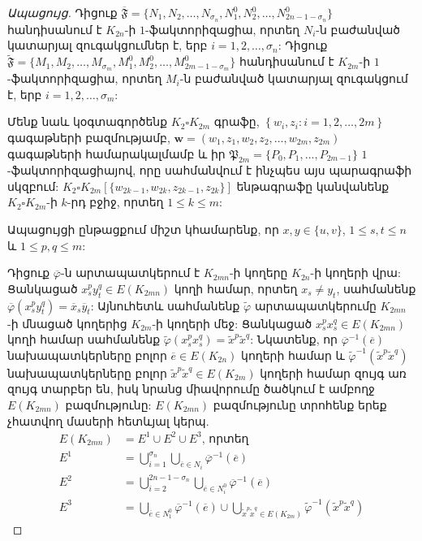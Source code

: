\begin{hide}
\begin{proof}[Ապացույց]
Դիցուք $\overline{\mathfrak{F}} = \{ N_1,N_2,\ldots,N_{\sigma_n},N^0_1,N^0_2,\ldots, N^0_{2n-1-\sigma_n} \}$ հանդիսանում է $K_{2n}$-ի $1$-ֆակտորիզացիա, որտեղ $N_i$-ն բաժանված կատարյալ զուգակցումներ է, երբ $i=1,2,\ldots,\sigma_n$: Դիցուք $\widetilde{\mathfrak{F}} = \{ M_1,M_2,\ldots,M_{\sigma_m},M^0_1,M^0_2,\ldots, M^0_{2m-1-\sigma_m} \}$ հանդիսանում է $K_{2m}$-ի $1$-ֆակտորիզացիա, որտեղ $M_i$-ն բաժանված կատարյալ զուգակցում է, երբ $i=1,2,\ldots,\sigma_m$: 

Մենք նաև կօգտագործենք $K_2 \square K_{2m}$ գրաֆը, $\left\{w_i,z_i : i=1,2,\ldots,2m\right\}$ գագաթների բազմությամբ, $\mathbf{w} = \left( w_1,z_1,w_2,z_2,\ldots,w_{2m},z_{2m} \right)$ գագաթների համարակալմամբ և իր $\mathfrak{P}_{2m} = \{P_0,P_1,\ldots,P_{2m-1} \}$ $1$-ֆակտորիզացիայով, որը սահմանվում է ինչպես այս պարագրաֆի սկզբում: $K_2 \square K_{2m}[\{w_{2k-1},w_{2k},z_{2k-1},z_{2k}\}]$ ենթագրաֆը կանվանենք $K_2 \square K_{2m}$-ի $k$-րդ բջիջ, որտեղ $1 \leq k \leq m$:

Ապացույցի ընթացքում միշտ կհամարենք, որ $x,y \in \{u,v\}$, $1 \leq s,t \leq n$ և $1 \leq p,q \leq m$:

Դիցուք $\overline{\varphi}$-ն արտապատկերում է $K_{2mn}$-ի կողերը $K_{2n}$-ի կողերի վրա: Ցանկացած $x^p_sy^q_t \in E(K_{2mn})$ կողի համար, որտեղ $x_s \neq y_t$, սահմանենք $\overline{\varphi}(x^p_sy^q_t)=\overline{x}_s\overline{y}_t$: Այնուհետև սահմանենք $\widetilde{\varphi}$ արտապատկերումը $K_{2mn}$-ի մնացած կողերից $K_{2m}$-ի կողերի մեջ: Ցանկացած $x^p_sx^q_s \in E(K_{2mn})$ կողի համար սահմանենք $\widetilde{\varphi}( x^p_sx^q_s ) = \widetilde{x}^p\widetilde{x}^q$: Նկատենք, որ $\overline{\varphi}^{-1}(\overline{e})$ նախապատկերները բոլոր $\overline{e} \in E(K_{2n})$ կողերի համար և $\widetilde{\varphi}^{-1}(\widetilde{x}^p\widetilde{x}^q)$ նախապատկերները բոլոր $\widetilde{x}^p\widetilde{x}^q \in E(K_{2m})$ կողերի համար զույգ առ զույգ տարբեր են, իսկ նրանց միավորումը ծածկում է ամբողջ $E(K_{2mn})$ բազմությունը: $E(K_{2mn})$ բազմությունը տրոհենք երեք չհատվող մասերի հետևյալ կերպ.
\begin{align*}
E(K_{2mn}) &= E^1 \cup E^2 \cup E^3 \text{, որտեղ} \\
E^1 &= \bigcup\limits_{i=1}^{\sigma_n}{\bigcup\limits_{\overline{e} \in N_i}{\overline{\varphi}^{-1}(\overline{e})}} \\
E^2 &= \bigcup\limits_{i=2}^{2n-1-\sigma_n}\bigcup\limits_{\overline{e} \in N^0_i}{\overline{\varphi}^{-1}(\overline{e})} \\
E^3 &= \bigcup\limits_{\overline{e} \in N^0_1}{\overline{\varphi}^{-1}(\overline{e})} \cup \bigcup\limits_{\widetilde{x}^p\widetilde{x}^q \in E(K_{2m})}{\widetilde{\varphi}^{-1}(\widetilde{x}^p\widetilde{x}^q)}
\end{align*}


\end{proof}
\end{hide}
